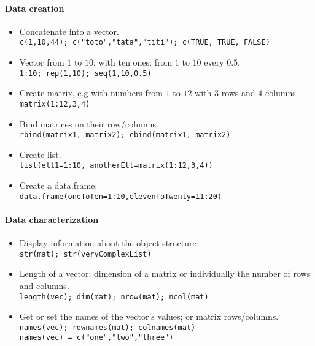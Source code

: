 \documentclass[12pt]{article}
\begin{document}
\paragraph{Data creation}
\begin{itemize}
  \item Concatenate into a vector. \\ 
    \verb!c(1,10,44); c("toto","tata","titi"); c(TRUE, TRUE, FALSE)!
  \item Vector from $1$ to $10$; with ten ones; from $1$ to $10$ every $0.5$. \\ 
    \verb!1:10; rep(1,10); seq(1,10,0.5)!
  \item Create matrix, e.g with numbers from $1$ to $12$ with $3$ rows and $4$ columns\\
    \verb!matrix(1:12,3,4)!
  \item Bind matrices on their row/columns. \\
    \verb!rbind(matrix1, matrix2); cbind(matrix1, matrix2)!
  \item Create list. \\
    \verb!list(elt1=1:10, anotherElt=matrix(1:12,3,4))!
  \item Create a data.frame.\\
    \verb!data.frame(oneToTen=1:10,elevenToTwenty=11:20)!
\end{itemize}


\newpage
\paragraph{Data characterization} 
\begin{itemize} 
  \item Display information about the object structure\\ 
    \verb!str(mat); str(veryComplexList)!
  \item Length of a vector; dimension of a matrix or individually the number of rows and columns.\\
    \verb!length(vec); dim(mat); nrow(mat); ncol(mat)!
  \item Get or set the names of the vector's values; or matrix rows/columns.\\
    \verb!names(vec); rownames(mat); colnames(mat)! \\
    \verb!names(vec) = c("one","two","three")!
\end{itemize}


\end{document}
